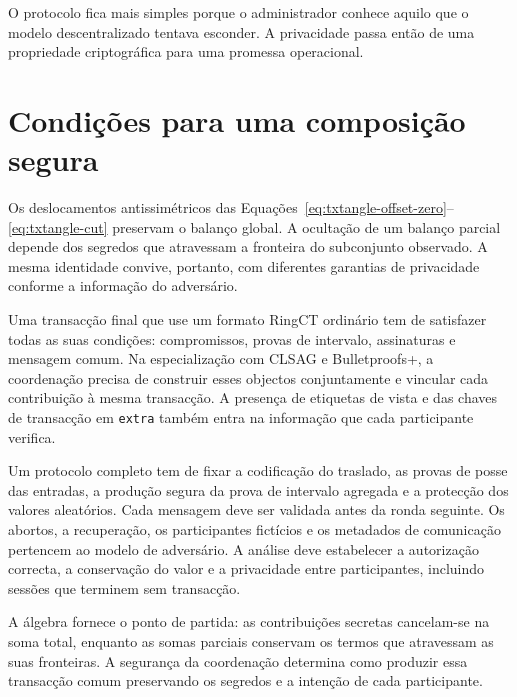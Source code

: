 O protocolo fica mais simples porque o administrador conhece aquilo que o
modelo descentralizado tentava esconder. A privacidade passa então de uma
propriedade criptográfica para uma promessa operacional.

\section{Condições para uma composição segura}
\label{sec:txtangle-modern-status}

Os deslocamentos antissimétricos das
Equações~\eqref{eq:txtangle-offset-zero}--\eqref{eq:txtangle-cut} preservam o
balanço global. A ocultação de um balanço parcial depende dos segredos que
atravessam a fronteira do subconjunto observado. A mesma identidade convive,
portanto, com diferentes garantias de privacidade conforme a informação do
adversário.

Uma transacção final que use um formato RingCT ordinário tem de satisfazer
todas as suas condições: compromissos, provas de intervalo, assinaturas e
mensagem comum. Na especialização com CLSAG e Bulletproofs+, a coordenação
precisa de construir esses objectos conjuntamente e vincular cada
contribuição à mesma transacção. A presença de etiquetas de vista e das
chaves de transacção em \texttt{extra} também entra na informação que cada
participante verifica.

Um protocolo completo tem de fixar a codificação do traslado, as provas de
posse das entradas, a produção segura da prova de intervalo agregada e a
protecção dos valores aleatórios. Cada mensagem deve ser validada antes da
ronda seguinte. Os abortos, a recuperação, os participantes fictícios e os
metadados de comunicação pertencem ao modelo de adversário. A análise deve
estabelecer a autorização correcta, a conservação do valor e a privacidade
entre participantes, incluindo sessões que terminem sem transacção.

A álgebra fornece o ponto de partida: as contribuições secretas cancelam-se
na soma total, enquanto as somas parciais conservam os termos que atravessam
as suas fronteiras. A segurança da coordenação determina como produzir essa
transacção comum preservando os segredos e a intenção de cada participante.
